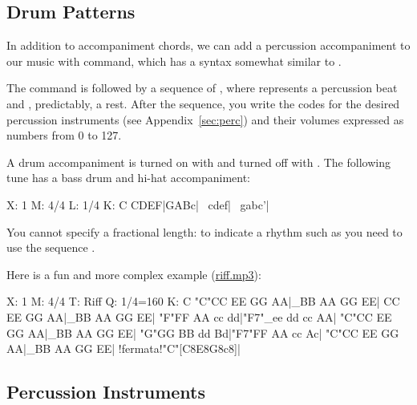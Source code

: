 \documentclass[a4paper,fullpage,12pt]{book}
\begin{document}
\subsection{Drum Patterns}
\label{sec:rhythm}

In addition to accompaniment chords, we can add a percussion
accompaniment to our music with  command, which has
a syntax somewhat similar to .

The  command is followed by a sequence of ,
where  represents a percussion beat and , predictably, a
rest. After the sequence, you write the codes for the desired
percussion instruments (see Appendix~\ref{sec:perc}) and their volumes
expressed as numbers from 0 to 127.

A drum accompaniment is turned on with  and
turned off with . The following tune has a
bass drum and hi-hat accompaniment:

\begin{abcsource}
X: 1
M: 4/4
L: 1/4
K: C
CDEF|GABc|\
cdef|\
gabc'|
\end{abcsource}

You cannot specify a fractional length: to indicate a rhythm such as
 you need to use the sequence
\cmd{d4d4d4d3d3d3d3}.

Here is a fun and more complex example
(\href{run:riff.mp3}{riff.mp3}):

\begin{abcsource}
X: 1
M: 4/4
T: Riff
Q: 1/4=160
K: C
"C"CC EE GG AA|_BB AA GG EE|
CC EE GG AA|_BB AA GG EE|
"F"FF AA cc dd|"F7"_ee dd cc AA|
"C"CC EE GG AA|_BB AA GG EE|
"G"GG BB dd Bd|"F7"FF AA cc Ac|
"C"CC EE GG AA|_BB AA GG EE|
!fermata!"C"[C8E8G8c8]|
\end{abcsource}


\subsection{Percussion Instruments}
\end{document}
